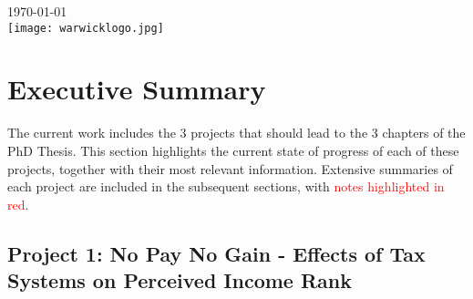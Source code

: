 \documentclass[12pt]{article}%
\begin{document}
\begin{titlepage}


{\large \today}\\[2cm] %


\texttt{[image: warwicklogo.jpg]}\\[1cm] %
 

\vfill %

\end{titlepage}

\tableofcontents


\newpage
\section{Executive Summary}
The current work includes the 3 projects that should lead to the 3 chapters of the PhD Thesis. This section highlights the current state of progress of each of these projects, together with their most relevant information. Extensive summaries of each project are included in the subsequent sections, with \textcolor{red}{notes highlighted in red}.

\subsection*{Project 1: No Pay No Gain - Effects of Tax Systems on Perceived Income Rank}
\end{document}
